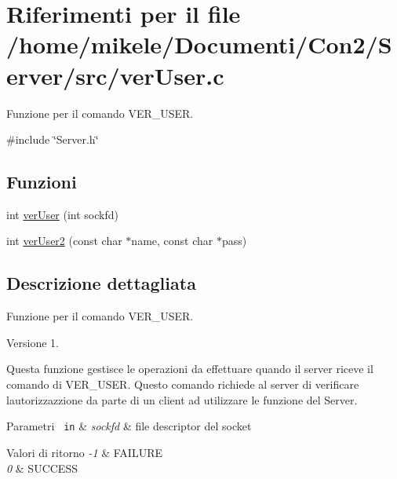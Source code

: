 \hypertarget{a00059}{}\section{Riferimenti per il file /home/mikele/\+Documenti/\+Con2/\+Server/src/ver\+User.c}
\label{a00059}


Funzione per il comando V\+E\+R\+\_\+\+U\+S\+ER.  


{\ttfamily \#include \char`\"{}Server.\+h\char`\"{}}\newline
\subsection*{Funzioni}
\begin{DoxyCompactItemize}
\item 
int \mbox{\hyperlink{a00059_aec82af81abb495a2314adb5515628cde}{ver\+User}} (int sockfd)
\item 
int \mbox{\hyperlink{a00059_afb6bcf6d0cbea179df5b49e8cfb1a4ae}{ver\+User2}} (const char $\ast$name, const char $\ast$pass)
\end{DoxyCompactItemize}


\subsection{Descrizione dettagliata}
Funzione per il comando V\+E\+R\+\_\+\+U\+S\+ER. 

\begin{DoxyVersion}{Versione}
1.
\end{DoxyVersion}
Questa funzione gestisce le operazioni da effettuare quando il server riceve il comando di V\+E\+R\+\_\+\+U\+S\+ER. Questo comando richiede al server di verificare l\textquotesingle{}autorizzazzione da parte di un client ad utilizzare le funzione del Server.


\begin{DoxyParams}[1]{Parametri}
\mbox{\texttt{ in}}  & {\em sockfd} & file descriptor del socket\\
\hline
\end{DoxyParams}

\begin{DoxyRetVals}{Valori di ritorno}
{\em -\/1} & F\+A\+I\+L\+U\+RE \\
\hline
{\em 0} & S\+U\+C\+C\+E\+SS \\
\hline
\end{DoxyRetVals}


